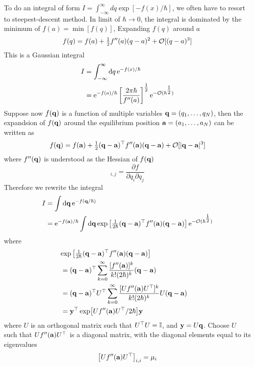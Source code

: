 \documentclass[10pt]{article}
\begin{document}
	To do an integral of form $I = \int_{-\infty}^{\infty} dq \exp[-f(x)/\hbar]$, we often have to resort to steepest-descent method. In limit of $\hbar \to 0$, the integral is dominated by the minimum of $f(a) = \min[f(q)]$, Expanding $f(q)$ around $a$
	\begin{equation}
		f(q) = f(a)	+ \tfrac{1}{2} f''(a) (q-a)^2 + {\mathcal{O}}[(q-a)^3]
	\end{equation}
	This is a Gaussian integral
	\begin{align*}
		I &= \int_{-\infty}^{\infty} \dd q \, {\mathrm{e}}^{-f(x)/\hbar} \\
		&= {\mathrm{e}}^{-f(a)/\hbar} \left[\frac{2\pi \hbar}{f''(a)}\right]^{\tfrac{1}{2}} {\mathrm{e}}^{-{\mathcal{O}}(\hbar^{\tfrac{1}{2}})}
	\end{align*}
	Suppose now $f({\bf q})$ is a function of multiple variables ${\bf q} = (q_1, \dots, q_N)$, then the expandsion of $f({\bf q})$ around the equilibrium position ${\bf a} = (a_1, \dots, a_N)$ can be written as
	\begin{equation}
		f({\bf q}) = f({\bf a}) + \tfrac{1}{2} ({\bf q} - {\bf a})^\top f''({\bf a}) ({\bf q} - {\bf a}) + {\mathcal{O}}[|{\bf q} - {\bf a}|^3]
	\end{equation}
	where $f''({\bf q})$ is understood as the Hessian of $f({\bf q})$
	\begin{equation}
		[f''(\bfq)]_{i,j} = \frac{\partial f}{\partial q_i \partial q_j}
	\end{equation}
	Therefore we rewrite the integral
	\begin{align*}
		I &= \int \dd \bfq \, \e^{-f(\bfq/\hbar)}\\
		&= \e^{-f(\bfa)/\hbar} \int \dd \bfq \exp\left[ \tfrac{1}{2\hbar} (\bfq - \bfa)^\top f''(\bfa) (\bfq - \bfa) \right] \e^{-\mcO(\hbar^{\thalf})}
	\end{align*}
	where
	\begin{align*}
		\lefteqn{\exp \left[ \tfrac{1}{2\hbar} (\bfq - \bfa)^\top f''(\bfa) (\bfq - \bfa) \right]} \\
		&= (\bfq - \bfa)^\top \sum_{k=0}^{\infty} \frac{[f''(\bfa)]^k}{k! (2\hbar)^k} (\bfq - \bfa)\\
		&= (\bfq - \bfa)^\top U^\top \sum_{k=0}^{\infty} \frac{[U f''(\bfa) U^\top]^k}{k! (2\hbar)^k} U(\bfq - \bfa)\\
		&= \bfy^\top \exp [U f''(\bfa) U^\top/2\hbar] \bfy
	\end{align*}
	where $U$ is an orthogonal matrix such that $U^\top U = {\mathbb{I}}$, and ${\bf y} = U {\bf q}$. Choose $U$ such that $Uf''({\bf a})U^\top$ is a diagonal matrix, with the diagonal elements equal to its eigenvalues
	\begin{equation}
		\left[Uf''({\bf a})U^\top\right]_{i,i} = \mu_i
	\end{equation}
\end{document}
